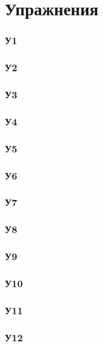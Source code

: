 \section{Упражнения}

\subsubsection*{У1}


\subsubsection*{У2}


\subsubsection*{У3}


\subsubsection*{У4}


\subsubsection*{У5}


\subsubsection*{У6}


\subsubsection*{У7}


\subsubsection*{У8}


\subsubsection*{У9}


\subsubsection*{У10}


\subsubsection*{У11}


\subsubsection*{У12}








